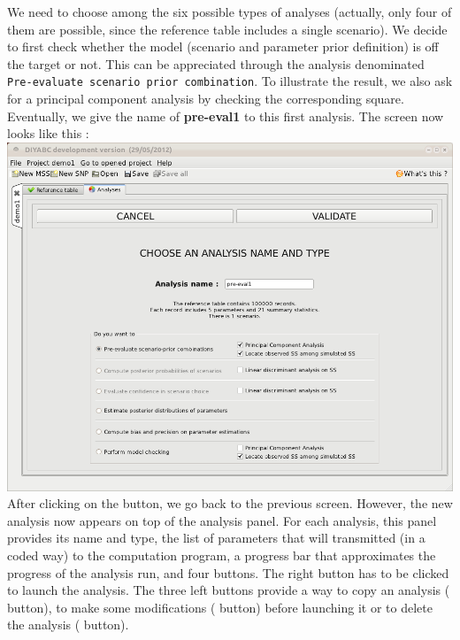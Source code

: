 We need to choose among the six possible types of analyses (actually, only four of them are possible, since the reference table includes a single scenario). We decide to first check whether the model (scenario and parameter prior definition) is off the target or not. This can be appreciated through the analysis denominated \texttt{Pre-evaluate scenario prior combination}. To illustrate the result, we also ask for a principal component analysis by checking the corresponding square. Eventually, we give the name of \textbf{pre-eval1} to this first analysis. The screen now looks like this :\\

\includegraphics[scale=0.35]{gui_pictures/Capture-DIYABC-29.png}\\ 

After clicking on the  button, we go back to the previous screen. However, the new analysis now appears on top of the analysis panel. For each analysis, this panel provides its name and type, the list of parameters that will transmitted (in a coded way) to the computation program, a progress bar that approximates the progress of the analysis run, and four buttons. The right button has to be clicked to launch the analysis. The three left buttons provide a way to copy an analysis ( button), to make some modifications ( button) before launching it or to delete the analysis ( button).\\
 

